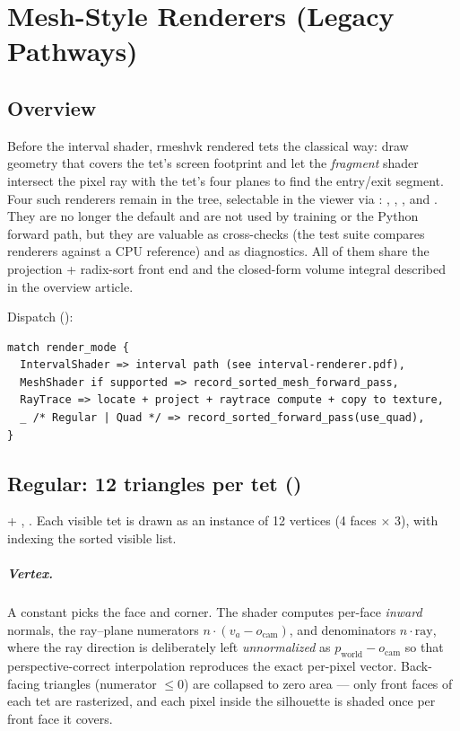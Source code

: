 \chapter{Mesh-Style Renderers (Legacy Pathways)}\label{ch:mesh-style-renderers}

\section{Overview}

Before the interval shader, rmeshvk rendered tets the classical way: draw
geometry that covers the tet's screen footprint and let the \emph{fragment}
shader intersect the pixel ray with the tet's four planes to find the
entry/exit segment. Four such renderers remain in the tree, selectable in the
viewer via : , ,
, and . They are no longer the default and
are not used by training or the Python forward path, but they are valuable as
cross-checks (the test suite compares renderers against a CPU reference) and
as diagnostics. All of them share the projection + radix-sort front end and
the closed-form volume integral described in the overview article.

Dispatch ():
\begin{lstlisting}
match render_mode {
  IntervalShader => interval path (see interval-renderer.pdf),
  MeshShader if supported => record_sorted_mesh_forward_pass,
  RayTrace => locate + project + raytrace compute + copy to texture,
  _ /* Regular | Quad */ => record_sorted_forward_pass(use_quad),
}
\end{lstlisting}

\section{Regular: 12 triangles per tet ()}

 + ,
. Each visible tet is drawn as an instance
of 12 vertices (4 faces $\times$ 3), with  indexing the
sorted visible list.

\paragraph{Vertex.} A constant  picks the face and
corner. The shader computes per-face \emph{inward} normals, the ray--plane
numerators $n \cdot (v_a - o_{\text{cam}})$, and denominators
$n \cdot \text{ray}$, where the ray direction is deliberately left
\emph{unnormalized} as $p_{\text{world}} - o_{\text{cam}}$ so that
perspective-correct interpolation reproduces the exact per-pixel vector.
Back-facing triangles (numerator $\le 0$) are collapsed to zero area ---
only front faces of each tet are rasterized, and each pixel inside the
silhouette is shaded once per front face it covers.

